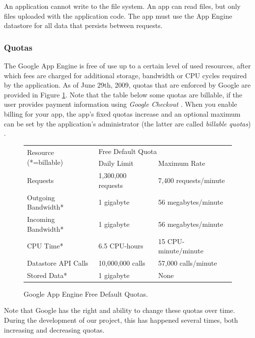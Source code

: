 An application cannot write to the file system. An app can read files, but only
files uploaded with the application code. The app must use the App Engine
datastore for all data that persists between requests.

\subsubsection{Quotas}
\label{appengine-quotas}
The Google App Engine is free of use up to a certain level of used resources,
after which fees are charged for additional storage, bandwidth or CPU cycles
required by the application. As of June 29th, 2009, quotas that are enforced by
Google are provided in Figure \ref{quota-table}. Note that the table below some
quotas are billable, if the user provides payment information using \emph{Google
Checkout} \cite{google-checkout-www}. When you enable billing for your app, the
app's fixed quotas increase and an optional maximum can be set by the
application's administrator (the latter are called \emph{billable quotas})
\cite{app-engine-quotas}.

\begin{figure}[h,t]
\begin{center}
\begin{tabular}{| l | l | l | }
\hline
\multirow{2}{*}{Resource (*=billable)} & \multicolumn{2}{|l|}{Free Default
Quota} \\
\cline{2-3}
& Daily Limit & Maximum Rate \\
\hline
Requests & 1,300,000 requests & 7,400 requests/minute \\
\hline
Outgoing Bandwidth* & 1 gigabyte & 56 megabytes/minute \\ 
\hline
Incoming Bandwidth* & 1 gigabyte & 56 megabytes/minute \\
\hline
CPU Time* & 6.5 CPU-hours & 15 CPU-minute/minute \\
\hline
Datastore API Calls & 10,000,000 calls & 57,000 calls/minute \\
\hline
Stored Data* & 1 gigabyte & None \\
\hline
\end{tabular}
\caption{Google App Engine Free Default Quotas. \label{quota-table}}
\end{center}
\end{figure}

Note that Google has the right and ability to change these quotas over time.
During the development of our project, this has happened several times, both
increasing and decreasing quotas.

